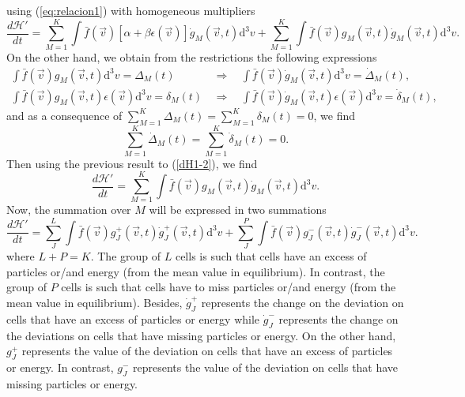 using (\ref{eq:relacion1}) with homogeneous multipliers
%
\begin{equation}\label{dH1-2}
    \frac{d\mathcal{H}'}{dt} = \sum_{M=1}^{K}\int\bar f(\vec{v})\left[
      \alpha+\beta \epsilon(\vec{v})
    \right]\dot g_M(\vec{v},t)\mathrm{d}^3v +\sum_{M=1}^{K}
    \int\bar f(\vec{v})g_M(\vec{v},t)\dot g_M(\vec{v},t)\mathrm{d}^3v . \nonumber 
\end{equation}
%
On the other hand, we obtain from the restrictions the following expressions
%
\begin{eqnarray}
    \int \bar{f}(\vec{v}) g_{M}(\vec{v},t) \mathrm{d}^{3}v=\Delta_M(t) \ \  &\Rightarrow&
    \ \  \int \bar{f}(\vec{v}) \dot{g}_{M}(\vec{v},t)\mathrm{d}^{3}v=\dot{\Delta}_M(t), \nonumber \\
    \int  \bar{f}(\vec{v}) g_{M}(\vec{v},t)\epsilon(\vec{v}) \mathrm{d}^{3}v=\delta_M(t) \ \  &\Rightarrow&
    \ \  \int \bar{f}(\vec{v}) \dot{g}_{M}(\vec{v},t)\epsilon(\vec{v}) \mathrm{d}^{3}v=\dot{\delta}_M(t), \nonumber 
\end{eqnarray}
%
and as a consequence of $\sum_{M=1}^{K} \Delta_M(t) =\sum_{M=1}^{K} \delta_M(t) =0$,
we find
%
\begin{equation}
    \sum_{M=1}^{K} \dot{\Delta}_M(t)  =\sum_{M=1}^{K} \dot{\delta}_{M}(t) =0.
\end{equation}
%
Then using the previous result to (\ref{dH1-2}), we find
%
\begin{equation}
  \frac{d\mathcal{H}'}{dt} = \sum_{M=1}^{K}\int\bar f(\vec{v})g_M(\vec{v},t)\dot g_M(\vec{v},t)\mathrm{d}^3v.
\end{equation}
%
Now, the summation over $M$ will be expressed in two summations
%
\begin{equation}\label{classicalH3}
    \frac{d\mathcal{H}'}{dt}=\sum_J^{L}\int
      \bar f(\vec{v})g_J^{+}(\vec{v},t)\dot g_J^{+}(\vec{v},t)\mathrm{d}^3v
      +\sum_J^{P}\int
        \bar f(\vec{v})g_J^{-}(\vec{v},t)\dot g_J^{-}(\vec{v},t)\mathrm{d}^3v.
\end{equation}
%
where $L+P=K$. The group of $L$ cells is such that cells have an excess of
particles or/and energy (from the mean value in equilibrium). In contrast,
the group of $P$ cells is such that cells have to miss particles or/and energy
(from the mean value in equilibrium). Besides, $\dot{g}^{+}_{J}$ represents the
change on the deviation on cells that have an excess of particles or energy
while $\dot{g}^{-}_{J}$  represents the change on the deviations on cells that
have missing particles or energy. 
On the other hand, $g^{+}_{J}$  represents the value of the deviation on cells
that have an excess of particles or energy. In contrast, $g^{-}_{J}$ represents
the value of the deviation on cells that have missing particles or energy.

